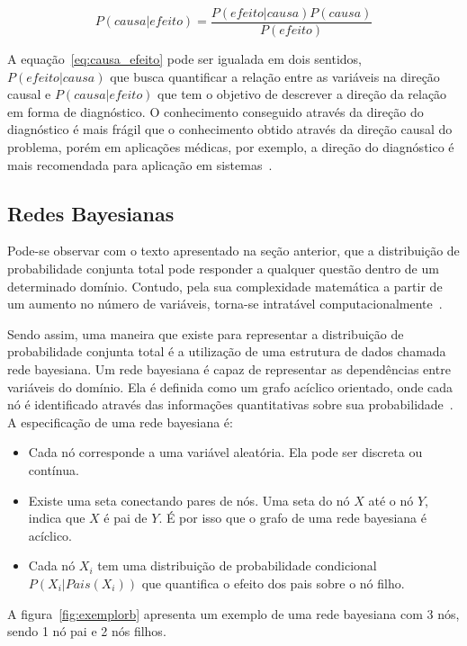 \begin{equation}
    \label{eq:causa_efeito}
    P(causa|efeito) = \frac{P(efeito|causa)P(causa)}{P(efeito)}
\end{equation}

A equação~\ref{eq:causa_efeito} pode ser igualada em dois sentidos, $P(efeito|causa)$ que busca quantificar a relação entre as variáveis na direção causal e $P(causa|efeito)$ que tem o objetivo de descrever a direção da relação em forma de diagnóstico. O conhecimento conseguido através da direção do diagnóstico é mais frágil que o conhecimento obtido através da direção causal do problema, porém em aplicações médicas, por exemplo, a direção do diagnóstico é mais recomendada para aplicação em sistemas~\cite{russell:2002}.

\subsection{Redes Bayesianas}
\label{sec:redes-bayesianas}
Pode-se observar com o texto apresentado na seção anterior, que a distribuição de probabilidade conjunta total pode responder a qualquer questão dentro de um determinado domínio. Contudo, pela sua complexidade matemática a partir de um aumento no número de variáveis, torna-se intratável computacionalmente~\cite{russell:2002}.

Sendo assim, uma maneira que existe para representar a distribuição de probabilidade conjunta total é a utilização de uma estrutura de dados chamada rede bayesiana. Um rede bayesiana é capaz de representar as dependências entre variáveis do domínio. Ela é definida como um grafo acíclico orientado, onde cada nó é identificado através das informações quantitativas sobre sua probabilidade~\cite{russell:2002}. A especificação de uma rede bayesiana é:

\begin{itemize}
    \item Cada nó corresponde a uma variável aleatória. Ela pode ser discreta ou contínua.
    \item Existe uma seta conectando pares de nós. Uma seta do nó $X$ até o nó $Y$, indica que $X$ é pai de $Y$. É por isso que o grafo de uma rede bayesiana é acíclico.
    \item Cada nó $X_i$ tem uma distribuição de probabilidade condicional $P(X_i|Pais(X_i))$ que quantifica o efeito dos pais sobre o nó filho.
\end{itemize}

A figura~\ref{fig:exemplorb} apresenta um exemplo de uma rede bayesiana com 3 nós, sendo 1 nó pai e 2 nós filhos.

